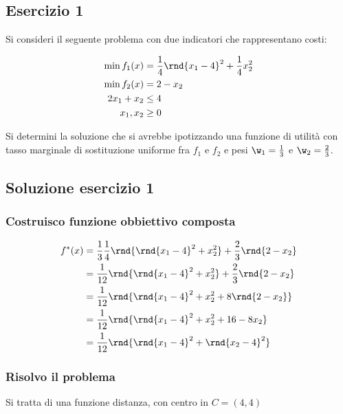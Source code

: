 \documentclass[\main/main.tex]{subfiles}
\begin{document}
\subsection{Esercizio 1}
Si consideri il seguente problema con due indicatori che rappresentano costi:

\begin{align*}
  \min f_1(x) & =\frac{1}{4}\rnd{x_1-4}^2 + \frac{1}{4}x_2^2 \\
  \min f_2(x) & = 2 -x_2                                     \\
  2x_1 + x_2  & \leq 4                                       \\
  x_1, x_2    & \geq 0
\end{align*}

Si determini la soluzione che si avrebbe ipotizzando una funzione di utilità con
tasso marginale di sostituzione uniforme fra $f_1$ e $f_2$ e pesi $\w_1 = \frac{1}{3}$ e $\w_2 = \frac{2}{3}$.

\subsection{Soluzione esercizio 1}

\subsubsection*{Costruisco funzione obbiettivo composta}

\begin{align*}
  f^*(x) & =\frac{1}{3}\frac{1}{4}\rnd{\rnd{x_1-4}^2 + x_2^2} + \frac{2}{3}\rnd{2-x_2} \\
         & = \frac{1}{12}\rnd{\rnd{x_1-4}^2 + x_2^2} + \frac{2}{3}\rnd{2-x_2}          \\
         & = \frac{1}{12}\rnd{\rnd{x_1-4}^2 + x_2^2 + 8\rnd{2-x_2}}                    \\
         & = \frac{1}{12}\rnd{\rnd{x_1-4}^2 + x_2^2 + 16-8x_2}                         \\
         & = \frac{1}{12}\rnd{\rnd{x_1-4}^2 + \rnd{x_2-4}^2}                           \\
\end{align*}

\subsubsection*{Risolvo il problema}

Si tratta di una funzione distanza, con centro in $C = (4,4)$
\end{document}
